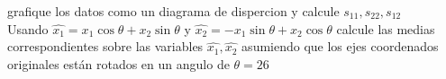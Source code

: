 \documentclass[10pt,a4paper]{article} %
\begin{document}
        grafique los datos como un diagrama de dispercion y calcule $ s_{11}
        ,s_{22} , s_{12}  $
        \\ Usando $ \hat{x_1}  = x_1 \cos{\theta } + x_2 \sin{\theta }   $  y $
        \hat{x_2}  = -x_1 \sin{\theta } + x_2 \cos{\theta }   $  calcule las
        medias correspondientes sobre las variables $ \hat{x_1}  , \hat{x_2 }
        $ asumiendo que los ejes coordenados originales están rotados en un
        angulo de $ \theta  = 26  $ \\

































    \nocite{*}
    
    
\end{document}
